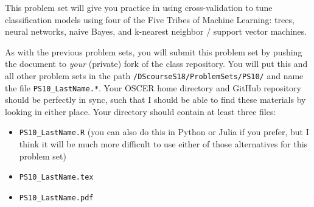 \documentclass[12pt,english]{exam}
\begin{document}
This problem set will give you practice in using cross-validation to tune classification models using four of the Five Tribes of Machine Learning: trees, neural networks, naive Bayes, and k-nearest neighbor / support vector machines.

As with the previous problem sets, you will submit this problem set by pushing the document to \emph{your} (private) fork of the class repository. You will put this and all other problem sets in the path \texttt{/DScourseS18/ProblemSets/PS10/} and name the file \texttt{PS10\_LastName.*}. Your OSCER home directory and GitHub repository should be perfectly in sync, such that I should be able to find these materials by looking in either place. Your directory should contain at least three files:
\begin{itemize}
    \item \texttt{PS10\_LastName.R} (you can also do this in Python or Julia if you prefer, but I think it will be much more difficult to use either of those alternatives for this problem set)
    \item \texttt{PS10\_LastName.tex}
    \item \texttt{PS10\_LastName.pdf}
\end{itemize}
\end{document}
